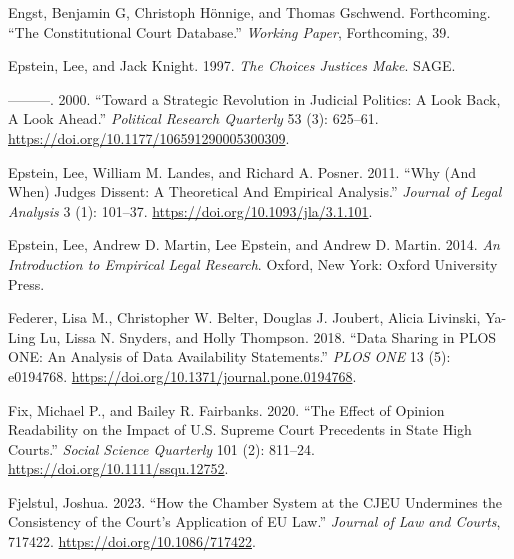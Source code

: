 \documentclass[
  11pt,
]{article}
\newlength{\cslhangindent}
\newenvironment{CSLReferences}[2] %
 {%
  \setlength{\parindent}{0pt}
  \ifodd #1 \everypar{\setlength{\hangindent}{\cslhangindent}}\ignorespaces\fi
  \ifnum #2 > 0
  \setlength{\parskip}{#2\baselineskip}
  \fi
 }%
 {}
\begin{document}
\begin{CSLReferences}{1}{0}
\leavevmode{}%
Engst, Benjamin G, Christoph Hönnige, and Thomas Gschwend. Forthcoming.
{``The {Constitutional Court Database}.''} \emph{Working Paper},
Forthcoming, 39.

\leavevmode{}%
Epstein, Lee, and Jack Knight. 1997. \emph{The {Choices Justices Make}}.
{SAGE}.

\leavevmode{}%
---------. 2000. {``Toward a {Strategic Revolution} in {Judicial
Politics}: {A Look Back}, {A Look Ahead}.''} \emph{Political Research
Quarterly} 53 (3): 625--61.
\url{https://doi.org/10.1177/106591290005300309}.

\leavevmode{}%
Epstein, Lee, William M. Landes, and Richard A. Posner. 2011. {``Why
({And When}) {Judges Dissent}: {A Theoretical And Empirical
Analysis}.''} \emph{Journal of Legal Analysis} 3 (1): 101--37.
\url{https://doi.org/10.1093/jla/3.1.101}.

\leavevmode{}%
Epstein, Lee, Andrew D. Martin, Lee Epstein, and Andrew D. Martin. 2014.
\emph{An {Introduction} to {Empirical Legal Research}}. {Oxford, New
York}: {Oxford University Press}.

\leavevmode{}%
Federer, Lisa M., Christopher W. Belter, Douglas J. Joubert, Alicia
Livinski, Ya-Ling Lu, Lissa N. Snyders, and Holly Thompson. 2018.
{``Data Sharing in {PLOS ONE}: {An} Analysis of {Data Availability
Statements}.''} \emph{PLOS ONE} 13 (5): e0194768.
\url{https://doi.org/10.1371/journal.pone.0194768}.

\leavevmode{}%
Fix, Michael P., and Bailey R. Fairbanks. 2020. {``The {Effect} of
{Opinion Readability} on the {Impact} of {U}.{S}. {Supreme Court
Precedents} in {State High Courts}.''} \emph{Social Science Quarterly}
101 (2): 811--24. \url{https://doi.org/10.1111/ssqu.12752}.

\leavevmode{}%
Fjelstul, Joshua. 2023. {``How the {Chamber System} at the {CJEU
Undermines} the {Consistency} of the {Court}'s {Application} of {EU
Law}.''} \emph{Journal of Law and Courts}, 717422.
\url{https://doi.org/10.1086/717422}.


\end{CSLReferences}
\end{document}
